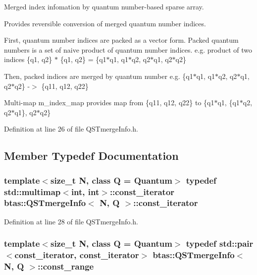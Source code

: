 Merged index infomation by quantum number-\/based sparse array. 

Provides reversible conversion of merged quantum number indices.

First, quantum number indices are packed as a vector form. Packed quantum numbers is a set of naive product of quantum number indices. e.\-g. product of two indices \{q1, q2\} $\ast$ \{q1, q2\} = \{q1$\ast$q1, q1$\ast$q2, q2$\ast$q1, q2$\ast$q2\}

Then, packed indices are merged by quantum number e.\-g. \{q1$\ast$q1, q1$\ast$q2, q2$\ast$q1, q2$\ast$q2\} -\/$>$ \{q11, q12, q22\}

Multi-\/map m\-\_\-index\-\_\-map provides map from \{q11, q12, q22\} to \{q1$\ast$q1, \{q1$\ast$q2, q2$\ast$q1\}, q2$\ast$q2\} 

Definition at line 26 of file Q\-S\-Tmerge\-Info.\-h.



\subsection{Member Typedef Documentation}
\subsubsection[{const\-\_\-iterator}]{\setlength{\rightskip}{0pt plus 5cm}template$<$size\-\_\-t N, class Q = Quantum$>$ typedef std\-::multimap$<$int, int$>$\-::{\bf const\-\_\-iterator} {\bf btas\-::\-Q\-S\-Tmerge\-Info}$<$ N, Q $>$\-::{\bf const\-\_\-iterator}}\label{d0/de7/classbtas_1_1QSTmergeInfo_abebcc6966dc7c41127384a24c05ab008}


Definition at line 28 of file Q\-S\-Tmerge\-Info.\-h.

\subsubsection[{const\-\_\-range}]{\setlength{\rightskip}{0pt plus 5cm}template$<$size\-\_\-t N, class Q = Quantum$>$ typedef std\-::pair$<${\bf const\-\_\-iterator}, {\bf const\-\_\-iterator}$>$ {\bf btas\-::\-Q\-S\-Tmerge\-Info}$<$ N, Q $>$\-::{\bf const\-\_\-range}}\label{d0/de7/classbtas_1_1QSTmergeInfo_ae8549fa7985019bef540eb99232bd8c0}


